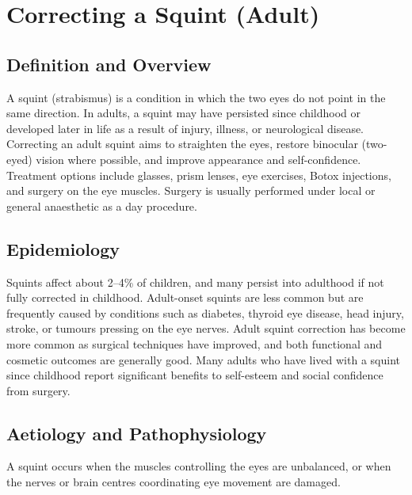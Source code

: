 \chapter{Correcting a Squint (Adult)}

\section*{Definition and Overview}
A squint (strabismus) is a condition in which the two eyes do not point in the same direction. In adults, a squint may have persisted since childhood or developed later in life as a result of injury, illness, or neurological disease. Correcting an adult squint aims to straighten the eyes, restore binocular (two-eyed) vision where possible, and improve appearance and self-confidence. Treatment options include glasses, prism lenses, eye exercises, Botox injections, and surgery on the eye muscles. Surgery is usually performed under local or general anaesthetic as a day procedure.

\section*{Epidemiology}
Squints affect about 2--4\% of children, and many persist into adulthood if not fully corrected in childhood. Adult-onset squints are less common but are frequently caused by conditions such as diabetes, thyroid eye disease, head injury, stroke, or tumours pressing on the eye nerves. Adult squint correction has become more common as surgical techniques have improved, and both functional and cosmetic outcomes are generally good. Many adults who have lived with a squint since childhood report significant benefits to self-esteem and social confidence from surgery.

\section*{Aetiology and Pathophysiology}
A squint occurs when the muscles controlling the eyes are unbalanced, or when the nerves or brain centres coordinating eye movement are damaged.

